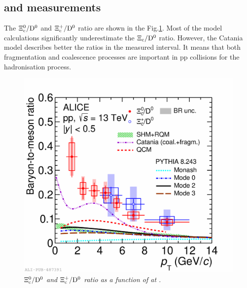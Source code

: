 \subsection{\Xiczp and \Oc measurements}
The $\rm \Xi_c^0/D^0$ and $\rm \Xi_c^{+}/D^0$ ratio are shown in the Fig.\ref{XicFig}.
Most of the model calculations significantly underestimate the $\Xi_{\rm c}/{\rm D^0}$ ratio.
However, the Catania model describes better the ratios in the measured \pt interval.
It means that both fragmentation and coalescence processes are important in pp collisions for the hadronisation process.
\begin{figure}[ht!]
    \centering
    \includegraphics[width=.85\textwidth]{fig/Xic0ToD0_pp13TeV_wModel-3.pdf}
    \caption{\it $\rm \Xi_c^0/D^0$ and $\rm \Xi_c^{+}/D^0$ ratio as a function of \pt at \tevt.}
    \label{XicFig}
\end{figure}

